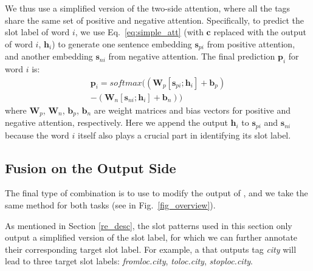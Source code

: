 We thus use a simplified version of the two-side attention, where all the tags share the same set of positive and negative attention.
Specifically, to predict the slot label of word $i$, we use Eq.~\ref{eq:simple_att} (with $\textbf{c}$ replaced with the \BLSTM output of word $i$, $\textbf{h}_i$) to generate one sentence embedding $\textbf{s}_{pi}$ from positive attention, and another embedding $\textbf{s}_{ni}$ from negative attention.
The final prediction $\textbf{p}_i$ for word $i$ is:
\begin{equation}
\begin{split}
\textbf{p}_i = softmax((\textbf{W}_p [\textbf{s}_{pi}; \textbf{h}_i] + \textbf{b}_p) \\- (\textbf{W}_n [\textbf{s}_{ni}; \textbf{h}_i] + \textbf{b}_n))
\end{split}
\end{equation}
where $\textbf{W}_{p}$, $\textbf{W}_{n}$, $\textbf{b}_{p}$, $\textbf{b}_{n}$ are weight matrices and bias vectors for positive and negative attention, respectively. Here we append the \BLSTM output $\textbf{h}_i$ to $\textbf{s}_{pi}$ and $\textbf{s}_{ni}$ because the word $i$ itself also plays a crucial part in identifying its slot label.

\subsection{Fusion on the Output Side}
\label{fusion_with_output}
The final type of combination is to use \RE to modify the output of \NN, and we take the same method for both tasks (see  in Fig.~\ref{fig_overview}).


As mentioned in Section \ref{re_desc}, 
the slot \RE patterns used in this section only output a simplified version of the slot label, for which we can further 
annotate their corresponding target slot label.
For example, a \RE that outputs tag \emph{city} will lead to three target slot labels: \emph{fromloc.city}, \emph{toloc.city}, \emph{stoploc.city}.

